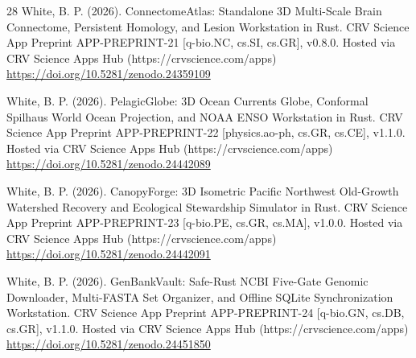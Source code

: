 \documentclass[10pt,letterpaper]{article}
\begin{document}
\begin{thebibliography}{28}
 White, B. P. (2026). ConnectomeAtlas: Standalone 3D Multi-Scale Brain Connectome, Persistent Homology, and Lesion Workstation in Rust. CRV Science App Preprint APP-PREPRINT-21 [q-bio.NC, cs.SI, cs.GR], v0.8.0. Hosted via CRV Science Apps Hub (https://crvscience.com/apps) \url{https://doi.org/10.5281/zenodo.24359109}

 White, B. P. (2026). PelagicGlobe: 3D Ocean Currents Globe, Conformal Spilhaus World Ocean Projection, and NOAA ENSO Workstation in Rust. CRV Science App Preprint APP-PREPRINT-22 [physics.ao-ph, cs.GR, cs.CE], v1.1.0. Hosted via CRV Science Apps Hub (https://crvscience.com/apps) \url{https://doi.org/10.5281/zenodo.24442089}

 White, B. P. (2026). CanopyForge: 3D Isometric Pacific Northwest Old-Growth Watershed Recovery and Ecological Stewardship Simulator in Rust. CRV Science App Preprint APP-PREPRINT-23 [q-bio.PE, cs.GR, cs.MA], v1.0.0. Hosted via CRV Science Apps Hub (https://crvscience.com/apps) \url{https://doi.org/10.5281/zenodo.24442091}

 White, B. P. (2026). GenBankVault: Safe-Rust NCBI Five-Gate Genomic Downloader, Multi-FASTA Set Organizer, and Offline SQLite Synchronization Workstation. CRV Science App Preprint APP-PREPRINT-24 [q-bio.GN, cs.DB, cs.GR], v1.1.0. Hosted via CRV Science Apps Hub (https://crvscience.com/apps) \url{https://doi.org/10.5281/zenodo.24451850}
\end{thebibliography}
\end{document}
